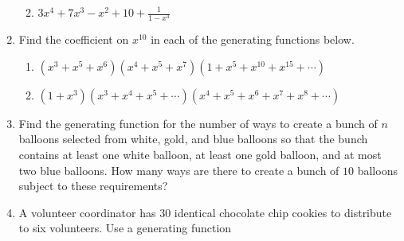\begin{enumerate}
\begin{enumerate}
 \item $\displaystyle 3x^4 + 7x^3 -x^2 + 10 + \frac{1}{1-x^3}$
  \end{enumerate}
\item Find the coefficient on $x^{10}$ in each of the generating
  functions below.
   \begin{enumerate}
   \item $(x^3+x^5+x^6)(x^4+x^5+x^7) (1+x^5+x^{10}+x^{15}+\cdots)$
   \item $(1+x^3) (x^3+x^4+x^5+\cdots)(x^4+x^5+x^6+x^7+x^8+\cdots)$
   \end{enumerate}
 \item Find the generating function for the number of ways to
   create a bunch of $n$ balloons selected from white, gold, and blue
   balloons so that the bunch contains at least one white balloon, at
   least one gold balloon, and at most two blue balloons. How many
   ways are there to create a bunch of $10$ balloons subject to these
   requirements? 
 \item A volunteer coordinator has $30$ identical chocolate chip
   cookies to distribute to six volunteers. Use a generating function

\end{enumerate}

